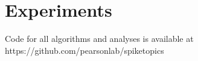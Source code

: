 \documentclass[10pt,letterpaper]{article}
\begin{document}
\section{Experiments}
Code for all algorithms and analyses is available at https://github.com/pearsonlab/spiketopics







\nolinenumbers

%
%
%
{}
%
%
\end{document}
